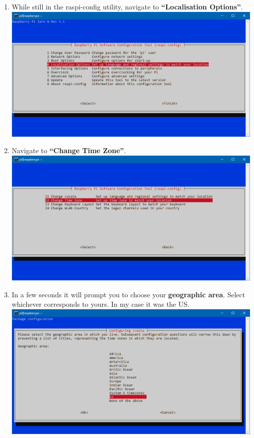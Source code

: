 \documentclass{article}
\begin{document}
\begin{enumerate}
  \item While still in the raspi-config utility, navigate to \textbf{``Localisation Options''}.
  \newline
  \newline
  \includegraphics[width=1.00\textwidth]{rclocale}
  \item Navigate to \textbf{``Change Time Zone''}.
  \newline
  \newline
  \includegraphics[width=1.00\textwidth]{rctime}
  \item In a few seconds it will prompt you to choose your \textbf{geographic area}. Select whichever corresponds to yours. In my case it was the US.
  \newline
  \newline
  \includegraphics[width=1.00\textwidth]{rctimeus}

\end{enumerate}
\end{document}
